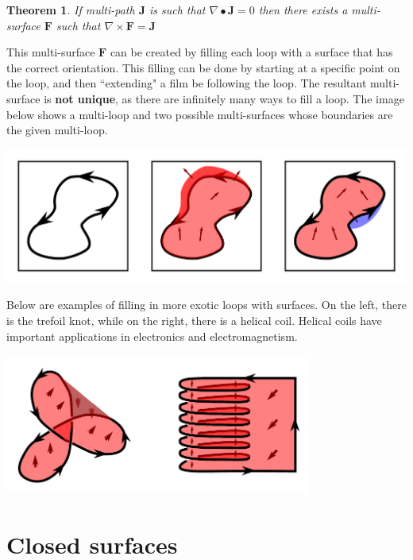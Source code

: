 \documentclass{book}
\newtheorem{thm}{Theorem}
\begin{document}
\begin{thm}
If multi-path \(\mathbf{J}\) is such that \(\nabla \bullet \mathbf{J} = 0\) then there exists a multi-surface \(\mathbf{F}\) such that \(\nabla \times \mathbf{F} = \mathbf{J}\)
\end{thm}

This multi-surface \(\mathbf{F}\) can be created by filling each loop with a surface that has the correct orientation. This filling can be done by starting at a specific point on the loop, and then ``extending" a film be following the loop. The resultant multi-surface is {\bf not unique}, as there are infinitely many ways to fill a loop. The image below shows a multi-loop and two possible multi-surfaces whose boundaries are the given multi-loop. 

\begin{center}
\includegraphics[width = \textwidth]{Boundaries/Surface_boundaries/surface_filling}
\end{center}

Below are examples of filling in more exotic loops with surfaces. On the left, there is the trefoil knot, while on the right, there is a helical coil. Helical coils have important applications in electronics and electromagnetism. 

\begin{center}
\includegraphics[width = 0.75\textwidth]{Boundaries/Surface_boundaries/exotic_surface_filling_examples}
\end{center}




\section{Closed surfaces}
\end{document}
